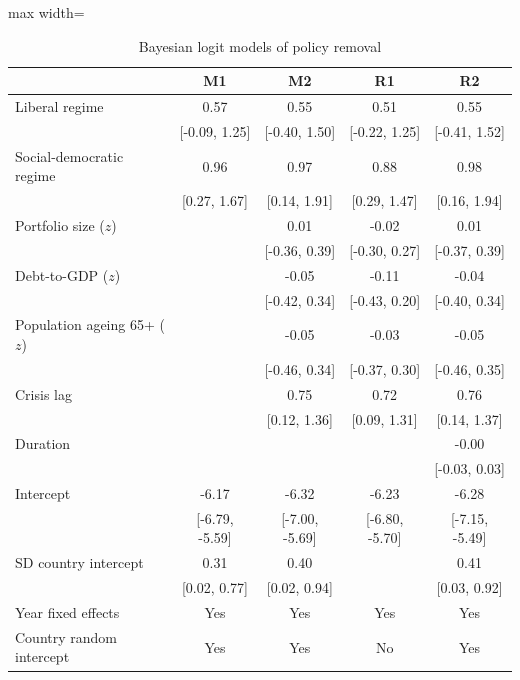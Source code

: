 \begin{table}[htbp]
\centering
\caption{\small Bayesian logit models of policy removal}
\label{tab:removal_models}
\begin{adjustbox}{max width=\textwidth}
\begin{tabular}{lcccc}
\toprule
 & M1 & M2 & R1 & R2 \\
\midrule
Liberal regime
  & 0.57 & 0.55 & 0.51 & 0.55 \\
  & [-0.09, 1.25] & [-0.40, 1.50] & [-0.22, 1.25] & [-0.41, 1.52] \\

Social-democratic regime
  & 0.96 & 0.97 & 0.88 & 0.98 \\
  & [0.27, 1.67] & [0.14, 1.91] & [0.29, 1.47] & [0.16, 1.94] \\

Portfolio size ($z$)
  &  & 0.01 & -0.02 & 0.01 \\
  &  & [-0.36, 0.39] & [-0.30, 0.27] & [-0.37, 0.39] \\

Debt-to-GDP ($z$)
  &  & -0.05 & -0.11 & -0.04 \\
  &  & [-0.42, 0.34] & [-0.43, 0.20] & [-0.40, 0.34] \\

Population ageing 65+ ($z$)
  &  & -0.05 & -0.03 & -0.05 \\
  &  & [-0.46, 0.34] & [-0.37, 0.30] & [-0.46, 0.35] \\

Crisis lag
  &  & 0.75 & 0.72 & 0.76 \\
  &  & [0.12, 1.36] & [0.09, 1.31] & [0.14, 1.37] \\

Duration
  &  &  &  & -0.00 \\
  &  &  &  & [-0.03, 0.03] \\

Intercept
  & -6.17 & -6.32 & -6.23 & -6.28 \\
  & [-6.79, -5.59] & [-7.00, -5.69] & [-6.80, -5.70] & [-7.15, -5.49] \\

SD country intercept
  & 0.31 & 0.40 &  & 0.41 \\
  & [0.02, 0.77] & [0.02, 0.94] &  & [0.03, 0.92] \\

\midrule
Year fixed effects
  & Yes & Yes & Yes & Yes \\

Country random intercept
  & Yes & Yes & No & Yes \\


\end{tabular}
\end{adjustbox}
\end{table}
